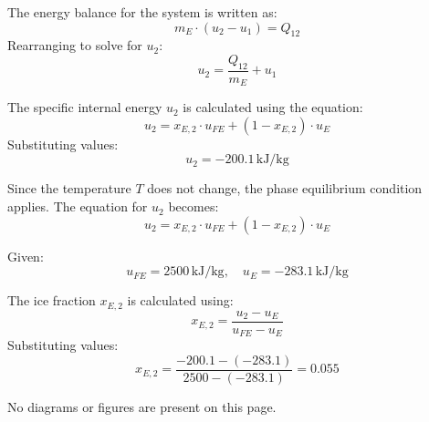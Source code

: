 The energy balance for the system is written as:  
\[
m_E \cdot (u_2 - u_1) = Q_{12}
\]  
Rearranging to solve for \( u_2 \):  
\[
u_2 = \frac{Q_{12}}{m_E} + u_1
\]  

The specific internal energy \( u_2 \) is calculated using the equation:  
\[
u_2 = x_{E,2} \cdot u_{FE} + (1 - x_{E,2}) \cdot u_{E}
\]  
Substituting values:  
\[
u_2 = -200.1 \, \text{kJ/kg}
\]  

Since the temperature \( T \) does not change, the phase equilibrium condition applies. The equation for \( u_2 \) becomes:  
\[
u_2 = x_{E,2} \cdot u_{FE} + (1 - x_{E,2}) \cdot u_{E}
\]  

Given:  
\[
u_{FE} = 2500 \, \text{kJ/kg}, \quad u_{E} = -283.1 \, \text{kJ/kg}
\]  

The ice fraction \( x_{E,2} \) is calculated using:  
\[
x_{E,2} = \frac{u_2 - u_{E}}{u_{FE} - u_{E}}
\]  
Substituting values:  
\[
x_{E,2} = \frac{-200.1 - (-283.1)}{2500 - (-283.1)} = 0.055
\]  

No diagrams or figures are present on this page.